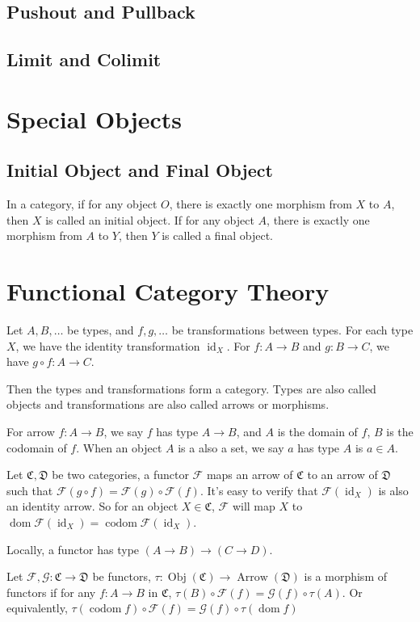 \documentclass{article}
\newcommand{\id}{\mathop{\mathrm{id}}}
\newcommand{\dom}{\mathop{\mathrm{dom}}}
\newcommand{\codom}{\mathop{\mathrm{codom}}}
\newcommand{\obj}{\mathop{\mathrm{Obj}}}
\newcommand{\arrow}{\mathop{\mathrm{Arrow}}}
\begin{document}
\subsection{Pushout and Pullback}

\subsection{Limit and Colimit}

\section{Special Objects}
\subsection{Initial Object and Final Object}
In a category, if for any object $O$, there is exactly one
morphism from $X$ to $A$, then $X$ is called an initial object.
If for any object $A$, there is exactly one morphism from $A$ to $Y$,
then $Y$ is called a final object.


\section{Functional Category Theory}
Let $A, B, \dots$ be types, and $f, g, \dots$ be transformations between types.
For each type $X$, we have the identity transformation $\id_X$.
For $f : A \to B$ and $g : B \to C$, we have $g \circ f : A \to C$.

Then the types and transformations form a category.
Types are also called objects and transformations are also called arrows or morphisms.

For arrow $f : A \to B$, we say $f$ has type $A \to B$,
and $A$ is the domain of $f$, $B$ is the codomain of $f$.
When an object $A$ is a also a set, we say $a$ has type $A$ is $a \in A$.

Let $\mathfrak{C}, \mathfrak{D}$ be two categories, a functor $\mathcal{F}$
maps an arrow of $\mathfrak{C}$ to an arrow of $\mathfrak{D}$
such that $\mathcal{F}(g \circ f) = \mathcal{F}(g) \circ \mathcal{F}(f)$.
It's easy to verify that $\mathcal{F}(\id_X)$ is also an identity arrow.
So for an object $X \in \mathfrak{C}$, $\mathcal{F}$ will map $X$ to
$\dom \mathcal{F}(\id_X) = \codom \mathcal{F}(\id_X)$.

Locally, a functor has type $(A \to B) \to (C \to D)$.

Let $\mathcal{F}, \mathcal{G} : \mathfrak{C} \to \mathfrak{D}$ be functors,
$\tau : \obj(\mathfrak{C}) \to \arrow(\mathfrak{D})$ is a morphism of functors if
for any $f : A \to B$ in $\mathfrak{C}$, $\tau(B) \circ \mathcal{F}(f) = \mathcal{G}(f) \circ \tau(A)$.
Or equivalently, $\tau(\codom f) \circ \mathcal{F}(f) = \mathcal{G}(f) \circ \tau(\dom f)$
\end{document}
